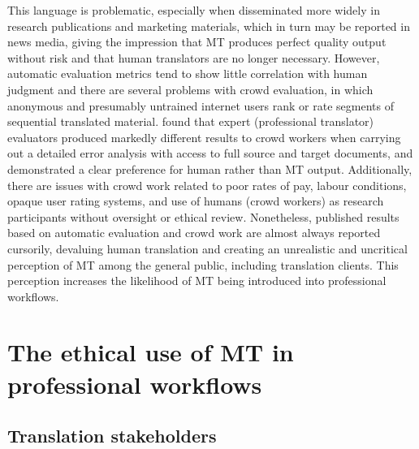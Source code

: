\documentclass[output=paper]{langscibook}
\begin{document}
This language is problematic, especially when disseminated more widely in research publications and marketing materials, which in turn may be reported in news media, giving the impression that MT produces perfect quality output without risk and that human translators are no longer necessary. However, automatic evaluation metrics tend to show little correlation with human judgment and there are several problems with crowd evaluation, in which anonymous and presumably untrained internet users rank or rate segments of sequential translated material. \citet{FreitagMacherey2021} found that expert (professional translator) evaluators produced markedly different results to crowd workers when carrying out a detailed error analysis with access to full source and target documents, and demonstrated a clear preference for human rather than MT output. Additionally, there are issues with crowd work related to poor rates of pay, labour conditions, opaque user rating systems, and use of humans (crowd workers) as research participants without oversight or ethical review. Nonetheless, published results based on automatic evaluation and crowd work are almost always reported cursorily, devaluing human translation and creating an unrealistic and uncritical perception of MT among the general public, including translation clients. This perception increases the likelihood of MT being introduced into professional workflows.

\section{The ethical use of MT in professional workflows}\label{sec:moorkens:3}
\subsection{Translation stakeholders}\label{sec:moorkens:3.1}
\end{document}

